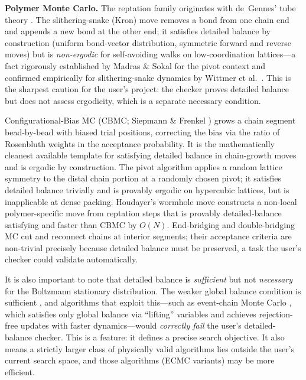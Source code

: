 \documentclass[10.5pt]{article}
\begin{document}
\textbf{Polymer Monte Carlo.}  The reptation family originates with de~Gennes'
tube theory \cite{degennes1971}.  The slithering-snake (Kron) move removes a
bond from one chain end and appends a new bond at the other end; it satisfies
detailed balance by construction (uniform bond-vector distribution, symmetric
forward and reverse moves) but is \emph{non-ergodic} for self-avoiding walks on
low-coordination lattices---a fact rigorously established by Madras \&
Sokal \cite{madras1988} for the pivot context and confirmed empirically for
slithering-snake dynamics by Wittmer et al.\ \cite{wittmer2003}.  This is the
sharpest caution for the user's project: the checker proves detailed balance but
does not assess ergodicity, which is a separate necessary condition.

Configurational-Bias MC (CBMC; Siepmann \& Frenkel \cite{siepmann1992}) grows a
chain segment bead-by-bead with biased trial positions, correcting the bias via
the ratio of Rosenbluth weights in the acceptance probability.  It is the
mathematically cleanest available template for satisfying detailed balance in
chain-growth moves and is ergodic by construction.  The pivot algorithm
\cite{madras1988} applies a random lattice symmetry to the distal chain
portion at a randomly chosen pivot; it satisfies detailed balance trivially and is
provably ergodic on hypercubic lattices, but is inapplicable at dense packing.
Houdayer's wormhole move \cite{houdayer2002} constructs a non-local
polymer-specific move from reptation steps that is provably detailed-balance
satisfying and faster than CBMC by $O(N)$.  End-bridging and double-bridging MC
\cite{pant1995,karayiannis2002} cut and reconnect chains at interior segments;
their acceptance criteria are non-trivial precisely because detailed balance must
be preserved, a task the user's checker could validate automatically.

It is also important to note that detailed balance is \emph{sufficient} but not
\emph{necessary} for the Boltzmann stationary distribution.  The weaker global
balance condition is sufficient \cite{manousiouthakis1999}, and algorithms that
exploit this---such as event-chain Monte Carlo \cite{ecmc2009}, which satisfies
only global balance via ``lifting'' variables and achieves rejection-free updates
with faster dynamics---would \emph{correctly fail} the user's detailed-balance
checker.  This is a feature: it defines a precise search objective.  It also means
a strictly larger class of physically valid algorithms lies outside the user's
current search space, and those algorithms (ECMC variants) may be more efficient.
\end{document}
